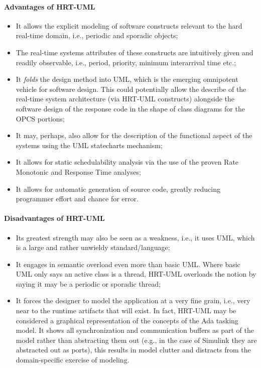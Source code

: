 \paragraph{Advantages of HRT-UML}
\begin{itemize}
\item{It allows the explicit modeling of software constructs relevant
  to the hard real-time domain, i.e., periodic and sporadic objects;}
\item{The real-time systems attributes of these constructs are
  intuitively given and readily observable, i.e., period, priority,
  minimum interarrival time etc.;}
\item{It \emph{folds} the design method into UML, which is the
  emerging omnipotent vehicle for software design. This could
  potentially allow the describe of the real-time system architecture
  (via HRT-UML constructs) alongside the software design of the
  response code in the shape of class diagrams for the OPCS portions;}
\item{It may, perhaps, also allow for the description of the
  functional aspect of the systems using the UML statecharts
  mechanism;}
\item{It allows for static schedulability analysis via the use of the
  proven Rate Monotonic and Response Time analyses;}
\item{It allows for automatic generation of source code, greatly
  reducing programmer effort and chance for error.}
\end{itemize}

\paragraph{Disadvantages of HRT-UML}
\begin{itemize}
\item{Its greatest strength may also be seen as a weakness, i.e., it
  uses UML, which is a large and rather unwieldy standard/language;}
\item{It engages in semantic overload even more than basic UML. Where
  basic UML only says an active class is a thread, HRT-UML overloads
  the notion by saying it may be a periodic or sporadic thread;}
\item{It forces the designer to model the application at a very fine
  grain, i.e., very near to the runtime artifacts that will exist. In
  fact, HRT-UML may be considered a graphical representation of the
  concepts of the Ada tasking model. It shows all synchronization and
  communication buffers as part of the model rather than abstracting
  them out (e.g., in the case of Simulink they are abstracted out as
  ports), this results in model clutter and distracts from the
  domain-specific exercise of modeling.}
\end{itemize}

